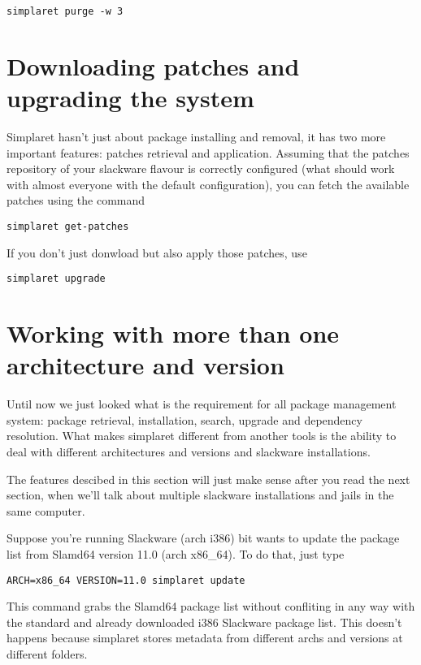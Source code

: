 \documentclass{article}
\begin{document}
\begin{verbatim}
simplaret purge -w 3
\end{verbatim}

\section{Downloading patches and upgrading the system}

Simplaret hasn't just about package installing and removal, it has two more important features: patches retrieval and application. Assuming that the patches repository of your slackware flavour is correctly configured (what should work with almost everyone with the default configuration), you can fetch the available patches using the command

\begin{verbatim}
simplaret get-patches
\end{verbatim}

If you don't just donwload but also apply those patches, use
  
\begin{verbatim}
simplaret upgrade
\end{verbatim}

\section{Working with more than one architecture and version}

Until now we just looked what is the requirement for all package management system: package retrieval, installation, search, upgrade and dependency resolution. What makes simplaret different from another tools is the ability to deal with different architectures and versions and slackware installations.

The features descibed in this section will just make sense after you read the next section, when we'll talk about multiple slackware installations and jails in the same computer.

Suppose you're running Slackware (arch i386) bit wants to update the package list from Slamd64 version 11.0 (arch x86\_64). To do that, just type

\begin{verbatim}
ARCH=x86_64 VERSION=11.0 simplaret update
\end{verbatim}

This command grabs the Slamd64 package list without confliting in any way with the standard and already downloaded i386 Slackware package list. This doesn't happens because simplaret stores metadata from different archs and versions at different folders.
\end{document}
